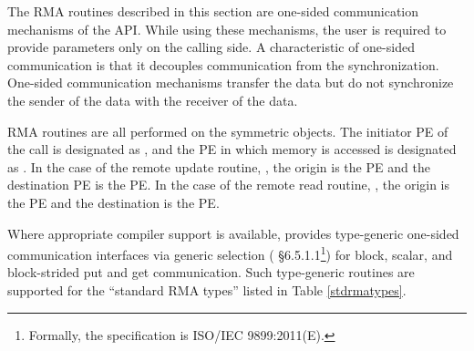 The \ac{RMA} routines described in this section are one-sided communication
mechanisms of the \openshmem{} \ac{API}. While using these mechanisms, the user
is required to provide parameters only on the calling side. A characteristic of
one-sided communication is that it decouples communication from the
synchronization. One-sided communication mechanisms transfer the data but do not
synchronize the sender of the data with the receiver of the data. 

\openshmem{} \ac{RMA} routines are all performed on the symmetric objects.  The
initiator \ac{PE} of the call is designated as \source{}, and the \ac{PE} in
which memory is accessed is designated as \dest{}. In the case of the remote
update routine, \PUT{}, the origin is the \source{} \ac{PE} and the destination
\ac{PE} is the \dest{} PE. In the case of the remote read routine, \GET{}, the
origin is the \dest{} \ac{PE} and the destination is the \source{} \ac{PE}.

Where appropriate compiler support is available, \openshmem{} provides type-generic 
one-sided communication interfaces via \Celev{} generic selection 
(\Celev{} \S6.5.1.1\footnote{Formally, the \Celev{} specification is ISO/IEC 9899:2011(E).})
for block, scalar, and block-strided put and get communication. 
Such type-generic routines are supported for the ``standard \ac{RMA} types''
listed in Table \ref{stdrmatypes}.

